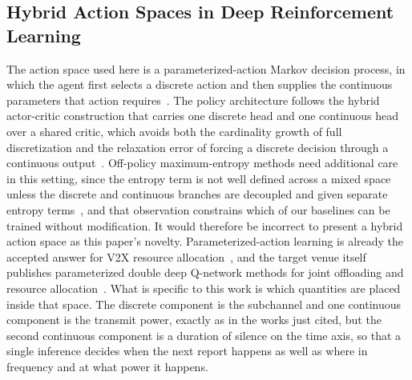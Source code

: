 \documentclass[journal]{IEEEtran}
\begin{document}
\subsection{Hybrid Action Spaces in Deep Reinforcement Learning}
The action space used here is a parameterized-action Markov decision process, in which the agent first selects a discrete action and then supplies the continuous parameters that action requires~\cite{masson2016}. The policy architecture follows the hybrid actor-critic construction that carries one discrete head and one continuous head over a shared critic, which avoids both the cardinality growth of full discretization and the relaxation error of forcing a discrete decision through a continuous output~\cite{fan2019}. Off-policy maximum-entropy methods need additional care in this setting, since the entropy term is not well defined across a mixed space unless the discrete and continuous branches are decoupled and given separate entropy terms~\cite{xu2023}, and that observation constrains which of our baselines can be trained without modification. It would therefore be incorrect to present a hybrid action space as this paper's novelty. Parameterized-action learning is already the accepted answer for V2X resource allocation~\cite{li2026}, and the target venue itself publishes parameterized double deep Q-network methods for joint offloading and resource allocation~\cite{chen20262}. What is specific to this work is which quantities are placed inside that space. The discrete component is the subchannel and one continuous component is the transmit power, exactly as in the works just cited, but the second continuous component is a duration of silence on the time axis, so that a single inference decides when the next report happens as well as where in frequency and at what power it happens.
\end{document}
